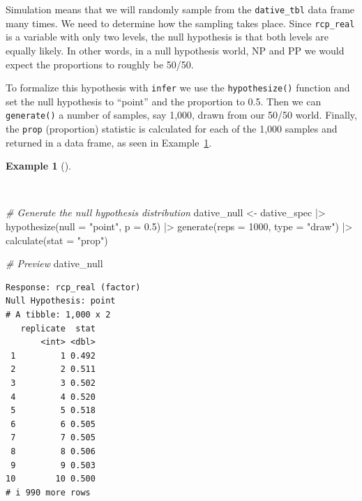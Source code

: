 \documentclass[
  letterpaper,
  krantz1]{latex/krantz-mod}
\newenvironment{Shaded}{\begin{snugshade}}{\end{snugshade}}
\newcommand{\AttributeTok}[1]{\textcolor[rgb]{0.00,0.00,0.00}{#1}}
\newcommand{\CommentTok}[1]{\textcolor[rgb]{0.00,0.00,0.00}{\textit{#1}}}
\newcommand{\DecValTok}[1]{\textcolor[rgb]{0.00,0.00,0.00}{#1}}
\newcommand{\FloatTok}[1]{\textcolor[rgb]{0.00,0.00,0.00}{#1}}
\newcommand{\FunctionTok}[1]{\textcolor[rgb]{0.00,0.00,0.00}{#1}}
\newcommand{\NormalTok}[1]{\textcolor[rgb]{0.00,0.00,0.00}{#1}}
\newcommand{\OtherTok}[1]{\textcolor[rgb]{0.00,0.00,0.00}{#1}}
\newcommand{\SpecialCharTok}[1]{\textcolor[rgb]{0.00,0.00,0.00}{#1}}
\newcommand{\StringTok}[1]{\textcolor[rgb]{0.00,0.00,0.00}{#1}}
\theoremstyle{definition}
\newtheorem{example}{Example}[chapter]
\theoremstyle{definition}
\theoremstyle{remark}
\begin{document}
Simulation means that we will randomly sample from the
\texttt{dative\_tbl} data frame many times. We need to determine how the
sampling takes place. Since \texttt{rcp\_real} is a variable with only
two levels, the null hypothesis is that both levels are equally likely.
In other words, in a null hypothesis world, NP and PP we would expect
the proportions to roughly be 50/50.

To formalize this hypothesis with \texttt{infer} we use the
\texttt{hypothesize()} function and set the null hypothesis to ``point''
and the proportion to 0.5. Then we can \texttt{generate()} a number of
samples, say 1,000, drawn from our 50/50 world. Finally, the
\texttt{prop} (proportion) statistic is calculated for each of the 1,000
samples and returned in a data frame, as seen in
Example~\ref{exm-infer-cat-null-hypothesis}.

\begin{example}[]\protect\hypertarget{exm-infer-cat-null-hypothesis}{}\label{exm-infer-cat-null-hypothesis}

~

\begin{Shaded}
\begin{Highlighting}[numbers=left,,]
\CommentTok{\# Generate the null hypothesis distribution}
\NormalTok{dative\_null }\OtherTok{\textless{}{-}}
\NormalTok{  dative\_spec }\SpecialCharTok{|\textgreater{}}
  \FunctionTok{hypothesize}\NormalTok{(}\AttributeTok{null =} \StringTok{"point"}\NormalTok{, }\AttributeTok{p =} \FloatTok{0.5}\NormalTok{) }\SpecialCharTok{|\textgreater{}}
  \FunctionTok{generate}\NormalTok{(}\AttributeTok{reps =} \DecValTok{1000}\NormalTok{, }\AttributeTok{type =} \StringTok{"draw"}\NormalTok{) }\SpecialCharTok{|\textgreater{}}
  \FunctionTok{calculate}\NormalTok{(}\AttributeTok{stat =} \StringTok{"prop"}\NormalTok{)}

\CommentTok{\# Preview}
\NormalTok{dative\_null}
\end{Highlighting}
\end{Shaded}

\begin{verbatim}
Response: rcp_real (factor)
Null Hypothesis: point
# A tibble: 1,000 x 2
   replicate  stat
       <int> <dbl>
 1         1 0.492
 2         2 0.511
 3         3 0.502
 4         4 0.520
 5         5 0.518
 6         6 0.505
 7         7 0.505
 8         8 0.506
 9         9 0.503
10        10 0.500
# i 990 more rows
\end{verbatim}

\end{example}
\end{document}
